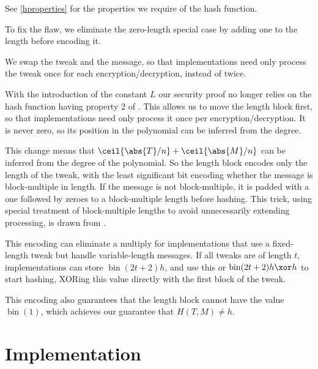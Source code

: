 \documentclass[letterpaper,11pt]{article}
\DeclareMathOperator{\fromint}{bin}
\begin{document}
See \autoref{hproperties}
for the properties we require of the hash function.

To fix the \cite{kumarhctr} flaw, we eliminate the zero-length special case
by adding one to the length before encoding it.

We swap the tweak and the message, so that implementations need only
process the tweak once for each encryption/decryption, instead of twice.

With the introduction of the constant \(L\)
our security proof no longer relies on the hash function
having property 2 of \cite[Section~3.3]{hctr}.
This allows us to move the length block first, so
that implementations need only process it once per encryption/decryption.
It is never zero, so its position in the
polynomial can be inferred from the degree.

This change means that \(\ceil{\abs{T}/n} + \ceil{\abs{M}/n}\)
can be inferred from the degree of the
polynomial. So the length block encodes
only the length of the tweak, 
with the least significant bit encoding 
whether the message is
block-multiple in length. If the message is not
block-multiple, it is padded with a one followed
by zeroes to a block-multiple length before hashing.
This trick, using special treatment of block-multiple
lengths to avoid unnecessarily extending processing,
is drawn from \cite{xcbc}.

This encoding can eliminate a multiply for implementations that use
a fixed-length tweak but handle variable-length messages.
If all tweaks are of length \(t\), implementations can store
\(\fromint(2t + 2)h\), and use this or \(\fromint(2t + 2)h \xor h\)
to start hashing, XORing this value directly with the
first block of the tweak.

This encoding also guarantees that the length block
cannot have the value \(\fromint(1)\), which achieves
our guarantee that \(H(T, M) \neq h\).


\section{Implementation}

\printbibliography[heading=bibintoc]
\end{document}
